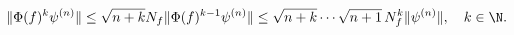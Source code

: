 \begin{equation*}
  \|\Phi(f)^k\psi^{(n)}\| \leq
  \sqrt{n+k}N_f\|\Phi(f)^{k-1}\psi^{(n)}\|\leq \sqrt{n+k}\cdots\sqrt{n+1}\, N_f^k\|\psi^{(n)}\|,\quad k\in\N.
\end{equation*}


